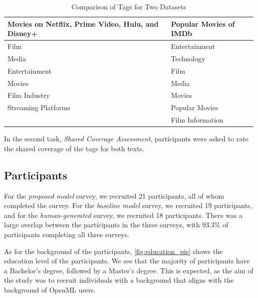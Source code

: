 \begin{table}[h]
    \centering
    \begin{tabular}{|>{\raggedright\arraybackslash}p{6cm}|>{\raggedright\arraybackslash}p{6cm}|}
        \hline
        \textbf{Movies on Netflix, Prime Video, Hulu, and Disney+} & \textbf{Popular Movies of IMDb} \\ \hline
        Film                                                       & Entertainment                   \\ \hline
        Media                                                      & Technology                      \\ \hline
        Entertainment                                              & Film                            \\ \hline
        Movies                                                     & Media                           \\ \hline
        Film Industry                                              & Movies                          \\ \hline
        Streaming Platforms                                        & Popular Movies                  \\ \hline
                                                                   & Film Information                \\ \hline
    \end{tabular}
    \caption{Comparison of Tags for Two Datasets}
    \label{tab:tag_comparison_two_datasets}
\end{table}


In the second task, \textit{Shared Coverage Assessment}, participants were asked to rate the shared coverage of the tags for both texts.

\subsection{Participants}
For the \textit{proposed model} survey, we recruited 21 participants, all of whom completed the survey. For the \textit{baseline model} survey, we recruited 19 participants, and for the \textit{human-generated} survey, we recruited 18 participants. There was a large overlap between the participants in the three surveys, with 93.3\% of participants completing all three surveys.

As for the background of the participants, \cref{fig:education_pie} shows the education level of the participants. We see that the majority of participants have a Bachelor's degree, followed by a Master's degree. This is expected, as the aim of the study was to recruit individuals with a background that aligns with the background of OpenML users.


